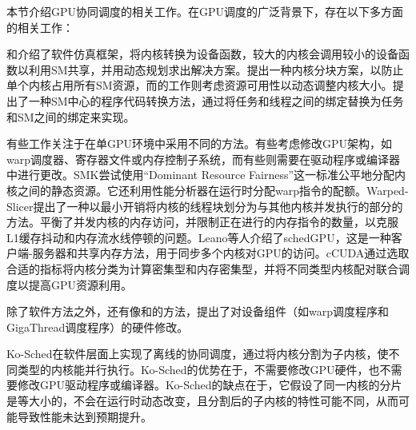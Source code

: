 本节介绍GPU协同调度的相关工作。在GPU调度的广泛背景下，存在以下多方面的相关工作：

\citet{6777559}和\citet{7802143}介绍了软件仿真框架，将内核转换为设备函数，较大的内核会调用较小的设备函数以利用SM共享，并用动态规划求出解决方案。\citet{6624111}提出一种内核分块方案，以防止单个内核占用所有SM资源，而\citet{10.1145/2451116.2451160}的工作则考虑资源可用性以动态调整内核大小。\citet{10.1145/2751205.2751213}提出了一种SM中心的程序代码转换方法，通过将任务和线程之间的绑定替换为任务和SM之间的绑定来实现。

有些工作关注于在单GPU环境中采用不同的方法。有些考虑修改GPU架构，如warp调度器、寄存器文件或内存控制子系统，而有些则需要在驱动程序或编译器中进行更改。SMK\cite{7446078}尝试使用“Dominant Resource Fairness”这一标准公平地分配内核之间的静态资源。它还利用性能分析器在运行时分配warp指令的配额。Warped-Slicer\cite{10.1109/ISCA.2016.29}提出了一种以最小开销将内核的线程块划分为与其他内核并发执行的部分的方法。\citet{8327010}平衡了并发内核的内存访问，并限制正在进行的内存指令的数量，以克服L1缓存抖动和内存流水线停顿的问题。Leano等人介绍了schedGPU\cite{8219713}，这是一种客户端-服务器和共享内存方法，用于同步多个内核对GPU的访问。cCUDA\cite{8853389}通过选取合适的指标将内核分类为计算密集型和内存密集型，并将不同类型内核配对联合调度以提高GPU资源利用。

除了软件方法之外，还有像\citet{10.1145/3007787.3001161}和\citet{8310677}的方法，提出了对设备组件（如warp调度程序和GigaThread调度程序）的硬件修改。

Ko-Sched在软件层面上实现了离线的协同调度，通过将内核分割为子内核，使不同类型的内核能并行执行。Ko-Sched的优势在于，不需要修改GPU硬件，也不需要修改GPU驱动程序或编译器。Ko-Sched的缺点在于，它假设了同一内核的分片是等大小的，不会在运行时动态改变，且分割后的子内核的特性可能不同，从而可能导致性能未达到预期提升。
